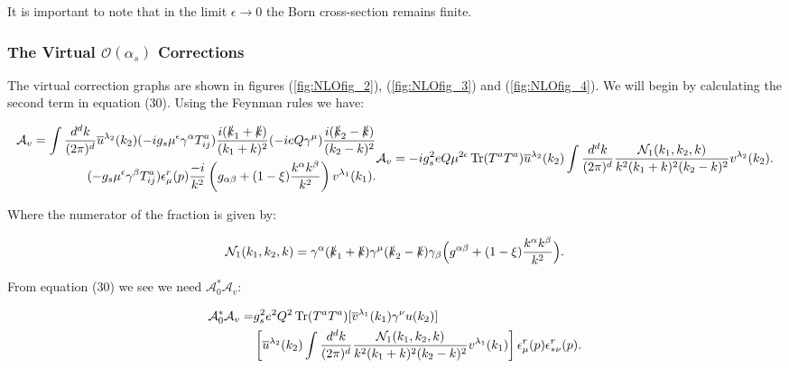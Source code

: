 	It is important to note that in the limit $\epsilon\rightarrow0$ the Born cross-section remains finite.

	\subsubsection{The Virtual $\mathcal{O}(\alpha_s)$ Corrections}

	The virtual correction graphs are shown in figures (\ref{fig:NLOfig_2}), (\ref{fig:NLOfig_3}) and (\ref{fig:NLOfig_4}).  We will begin by calculating
	the second term in equation (30).  Using the Feynman rules we have:

	\small
		\begin{subequations}
		\begin{align*}
			\mathcal{A}_v = \int\frac{d^{d}k}{(2\pi)^{d}} \overline{u}^{\lambda_2}(k_2)
			(-ig_s\mu^\epsilon\gamma^\alpha T^a_{ij})\frac{i(\slashed k_1 + \slashed k)}{(k_1+k)^2}
			(-ieQ\gamma^\mu)\frac{i(\slashed k_2 - \slashed k)}{(k_2 - k)^2}\\
			(-g_s\mu^\epsilon\gamma^\beta T^a_{ij})
			\epsilon^r_\mu(p)\frac{-i}{k^2}\left(g_{\alpha\beta} +
			(1-\xi)\frac{k^\alpha k^\beta}{k^2}\right)v^{\lambda_1}(k_1).
		\end{align*}
		\begin{align*}
			\mathcal{A}_v = -ig_s^2eQ\mu^{2\epsilon}\Tr(T^aT^a)\overline{u}^{\lambda_2}
			(k_2)\int\frac{d^{d}k}{(2\pi)^{d}}\frac{\mathcal{N}_1(k_1, k_2, k)}{k^2(k_1+k)^2(k_2-k)^2}v^{\lambda_2}(k_2).
		\end{align*}
		\end{subequations}
	\normalsize

	Where the numerator of the fraction is given by:

	\begin{equation}
	\mathcal{N}_1(k_1, k_2, k) = \gamma^\alpha(\slashed k_1 + \slashed k)\gamma^\mu(\slashed k_2 -
	\slashed k)\gamma_\beta\Big(g^{\alpha\beta} + (1-\xi)\frac{k^\alpha k^\beta}{k^2}\Big).
	\end{equation}

	From equation (30) we see we need $\mathcal{A}_0^*\mathcal{A}_v$:

	\begin{align}
		\mathcal{A}_0^*\mathcal{A}_v = &g_s^2e^2Q^2\operatorname{Tr}(T^aT^a)[\overline{v}^{\lambda_1}(k_1)\gamma^\nu u(k_2)]\\
		&\left[\overline{u}^{\lambda_2}(k_2)\int\frac{d^{d}k}{(2\pi)^{d}}\frac{\mathcal{N}_1(k_1, k_2, k)}
		{k^2(k_1+k)^2(k_2-k)^2}v^{\lambda_1}(k_1)\right]\epsilon^r_{\mu}(p)\epsilon^r_{*\nu}(p).
	\end{align}

